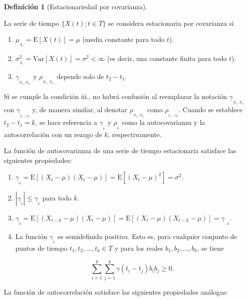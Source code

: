 \documentclass[
  us-letterpaper,
]{scrreprt}
\theoremstyle{plain}
\theoremstyle{definition}
\newtheorem{definition}{Definición}[chapter]
\theoremstyle{definition}
\theoremstyle{plain}
\theoremstyle{remark}
\begin{document}
\begin{definition}[Estacionariedad por
covarianza]\protect\hypertarget{def-estcov}{}\label{def-estcov}

La serie de tiempo \(\{X(t); t \in T\}\) se considera estacionaria por
covarianza si

\begin{enumerate}
\def\labelenumi{\roman{enumi}.}
\item
  \(\mu_{_{X_t}}=\mathrm E[X(t)] = \mu\) (media constante para todo
  \(t\)).
\item
  \(\sigma^2_{_{X_t}}=\mathrm{Var}[X(t)] = \sigma^2 < \infty\) (es
  decir, una constante finita para todo \(t\)).
\item
  \(\gamma_{_{X_{t_1},X_{t_2}}}\) y \(\rho_{_{X_{t_1},X_{t_2}}}\)
  depende solo de \(t_2 − t_1\).
\end{enumerate}

\end{definition}

Si se cumple la condición iii., no habrá confusión al reemplazar la
notación \(\gamma_{_{X_{t_1},X_{t_2}}}\) con \(\gamma_{_{t_1-t_2}}\) y,
de manera similar, al denotar \(\rho_{_{X_{t_1},X_{t_2}}}\) como
\(\rho_{_{t_1-t_2}}\). Cuando se establece \(t_2-t_1=k\), se hace
referencia a \(\gamma_{_k}\) y \(\rho_{_k}\) como la autocovarianza y la
autocorrelación con un rezago de \(k\), respectivamente.

La función de autocovarianza de una serie de tiempo estacionaria
satisface las siguientes propiedades:

\begin{enumerate}
\def\labelenumi{\roman{enumi}.}
\item
  \(\gamma_{_0}=\mathrm E[(X_{t}-\mu)(X_{t}-\mu)]=\mathrm E[(X_{t}-\mu)^2]=\sigma^2\).
\item
  \(|\gamma_{_k}|\leq \gamma_{_0}\) para todo \(k\).
\item
  \(\gamma_{_k}=\mathrm{E}[(X_{t-k}-\mu)(X_t-\mu)]=\mathrm{E}[(X_t-\mu)(X_{t-k}-\mu)]=\gamma_{_{-k}}\).
\item
  La función \(\gamma_{_k}\) es semidefinida positiva. Esto es, para
  cualquier conjunto de puntos de tiempo \(t_1, t_2,\ldots,t_k\in T\) y
  para los reales \(b_1,b_2,\ldots, b_k\), se tiene

  \[\sum_{i=1}^k \sum_{j=1}^k \gamma(t_i-t_j)b_i b_j\geq 0.
  \]
\end{enumerate}

La función de autocorrelación satisface las siguientes propiedades
análogas:
\end{document}
